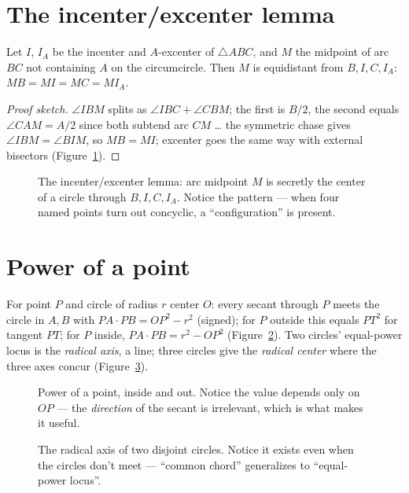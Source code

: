 \section{The incenter/excenter lemma}
\begin{lemma}
Let $I$, $I_A$ be the incenter and $A$-excenter of $\triangle ABC$, and
$M$ the midpoint of arc $BC$ not containing $A$ on the circumcircle.
Then $M$ is equidistant from $B,I,C,I_A$: $MB=MI=MC=MI_A$.
\end{lemma}
\begin{proof}[Proof sketch]
$\angle IBM$ splits as $\angle IBC + \angle CBM$; the first is $B/2$,
the second equals $\angle CAM = A/2$ since both subtend arc $CM$ \dots
the symmetric chase
gives $\angle IBM = \angle BIM$, so $MB=MI$; excenter goes the same way
with external bisectors (Figure~\ref{fig:incexc}).
\end{proof}
\begin{figure}[ht]\centering

\caption{The incenter/excenter lemma: arc midpoint $M$ is secretly the
center of a circle through $B,I,C,I_A$. Notice the pattern --- when
four named points turn out concyclic, a ``configuration'' is present.}
\label{fig:incexc}
\end{figure}

\section{Power of a point}
For point $P$ and circle of radius $r$ center $O$: every secant through
$P$ meets the circle in $A,B$ with $PA\cdot PB = OP^2-r^2$ (signed);
for $P$ outside this equals $PT^2$ for tangent $PT$; for $P$ inside,
$PA\cdot PB = r^2-OP^2$ (Figure~\ref{fig:power}). Two circles' equal-power
locus is the \emph{radical axis}, a line; three
circles give the \emph{radical center} where the three axes concur
(Figure~\ref{fig:radical}).
\begin{figure}[ht]\centering

\caption{Power of a point, inside and out. Notice the value depends
only on $OP$ --- the \emph{direction} of the secant is irrelevant, which
is what makes it useful.}
\label{fig:power}
\end{figure}
\begin{figure}[ht]\centering

\caption{The radical axis of two disjoint circles. Notice it exists
even when the circles don't meet --- ``common chord'' generalizes to
``equal-power locus''.}
\label{fig:radical}
\end{figure}

